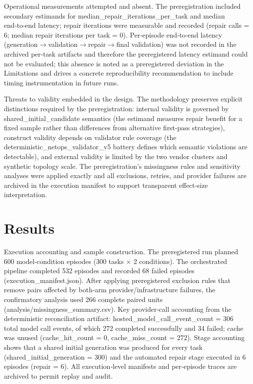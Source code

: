 \documentclass[conference]{IEEEtran}
\begin{document}
Operational measurements attempted and absent.  The preregistration included secondary estimands for median\_repair\_iterations\_per\_task and median end‑to‑end latency; repair iterations were measurable and recorded (repair calls = 6; median repair iterations per task = 0). Per‑episode end‑to‑end latency (generation\ensuremath{\rightarrow}validation\ensuremath{\rightarrow}repair\ensuremath{\rightarrow}final validation) was not recorded in the archived per‑task artifacts and therefore the preregistered latency estimand could not be evaluated; this absence is noted as a preregistered deviation in the Limitations and drives a concrete reproducibility recommendation to include timing instrumentation in future runs.

Threats to validity embedded in the design.  The methodology preserves explicit distinctions required by the preregistration: internal validity is governed by shared\_initial\_candidate semantics (the estimand measures repair benefit for a fixed sample rather than differences from alternative first‑pass strategies), construct validity depends on validator rule coverage (the deterministic\_netops\_validator\_v5 battery defines which semantic violations are detectable), and external validity is limited by the two vendor clusters and synthetic topology scale. The preregistration's missingness rules and sensitivity analyses were applied exactly and all exclusions, retries, and provider failures are archived in the execution manifest to support transparent effect‑size interpretation.

\section{Results}
Execution accounting and sample construction. The preregistered run planned 600 model‑condition episodes (300 tasks \ensuremath{\times} 2 conditions). The orchestrated pipeline completed 532 episodes and recorded 68 failed episodes (execution\_manifest.json). After applying preregistered exclusion rules that remove pairs affected by both‑arm provider/infrastructure failures, the confirmatory analysis used 266 complete paired units (analysis/missingness\_summary.csv). Key provider‑call accounting from the deterministic reconciliation artifact: hosted\_model\_call\_event\_count = 306 total model call events, of which 272 completed successfully and 34 failed; cache was unused (cache\_hit\_count = 0, cache\_miss\_count = 272). Stage accounting shows that a shared initial generation was produced for every task (shared\_initial\_generation = 300) and the automated repair stage executed in 6 episodes (repair = 6). All execution‑level manifests and per‑episode traces are archived to permit replay and audit.
\end{document}
